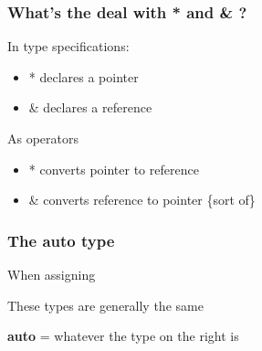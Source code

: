 \documentclass[14pt,a4paper,dvipsnames,usenames]{beamer}
\begin{document}
\begin{frame}[fragile]
  \frametitle{What's the deal with {\color{Marty}*} and {\color{Marty}\&} ?}

  In type specifications:

  \begin{itemize}
    \setlength\itemsep{0.5em}
    \item {\color{Marty}*} \:declares a pointer
    \item {\color{Marty}\&} \:declares a reference
  \end{itemize}

  \vspace{0.5em}
  As operators

  \begin{itemize}
    \setlength\itemsep{0.5em}
    \item {\color{Marty}*} \:converts pointer to reference
    \item {\color{Marty}\&} \:converts reference to pointer {\fontsize{8pt}{8pt}\selectfont \{sort of\}}
  \end{itemize}
  
\end{frame}

\begin{frame}[fragile]
  \frametitle{The {\color{FeebleWeek}auto} type}

  When assigning

  \begin{center}
  \end{center}

  These types are generally the same

  \vspace{1em}

  {\ttfamily\bfseries\color{FeebleWeek}auto} \; = \; whatever the type on the right is

  \CPPEleven
\end{frame}
\end{document}
